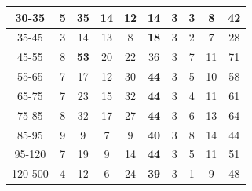 \begin{frame}
\begin{table}[h]
\begin{center}
\begin{tabular}{|c|c|c|c|c|c|c|c|c|c|}
    30-35 & 5 & {\color{blue}\bfseries{35}} & 14 & 12 & 14 & 3 & 3 & 8 & 42 \\ \hline
    35-45 & 3 & 14 & 13 & 8 & {\color{blue}\bfseries{18}} & 3 & 2 & 7 & 28 \\ \hline
    45-55 & 8 & {\color{blue}\bfseries{53}} & 20 & 22 & 36 & 3 & 7 & 11 & 71 \\ \hline
    55-65 & 7 & 17 & 12 & 30 & {\color{blue}\bfseries{44}} & 3 & 5 & 10 & 58 \\ \hline
    65-75 & 7 & 23 & 15 & 32 & {\color{blue}\bfseries{44}} & 3 & 4 & 11 & 61 \\ \hline
    75-85 & 8 & 32 & 17 & 27 & {\color{blue}\bfseries{44}} & 3 & 6 & 13 & 64 \\ \hline
    85-95 & 9 & 9 & 7 & 9 & {\color{blue}\bfseries{40}} & 3 & 8 & 14 & 44 \\ \hline
    95-120 & 7 & 19 & 9 & 14 & {\color{blue}\bfseries{44}} & 3 & 5 & 11 & 51 \\ \hline
    120-500 & 4 & 12 & 6 & 24 & {\color{blue}\bfseries{39}} & 3 & 1 & 9 & 48 \\ \hline
  \end{tabular}
  \label{tab:systInPercent_ELECTRON_WGamma}
  \end{center}
\end{table}
\end{frame}%

